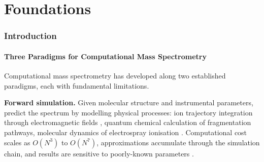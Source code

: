 \documentclass[11pt,twocolumn,a4paper]{article}
\theoremstyle{definition}
\theoremstyle{remark}
\begin{document}
\begin{abstract}
framework runs on a laptop integrated GPU (2--4 GB), with projected $5.7\times 10^9$ speedup over fingerprint comparison at PubChem scale ($N=10^8$). The central result: when observation is computation and the address is the trajectory, mass spectrometry becomes partition cell observation---not simulation, not database search, but physical measurement through GPU hardware oscillators.

\medskip
\noindent\textbf{Keywords:} observation-based computation, GPU fragment shaders, partition synthesis, Triple Equivalence, bounded phase space, ternary addressing, mass computing, compiled probe, physical observables, O(1) memory
\end{abstract}

\tableofcontents
\newpage


\part{Foundations}

\section{Introduction}
\label{sec:introduction}

\subsection{Three Paradigms for Computational Mass Spectrometry}

Computational mass spectrometry has developed along two established paradigms, each with fundamental limitations.

\textbf{Forward simulation.} Given molecular structure and instrumental parameters, predict the spectrum by modelling physical processes: ion trajectory integration through electromagnetic fields \citep{dahl2000simion}, quantum chemical calculation of fragmentation pathways, molecular dynamics of electrospray ionisation \citep{gross2017}. Computational cost scales as $O(N^3)$ to $O(N^7)$, approximations accumulate through the simulation chain, and results are sensitive to poorly-known parameters \citep{march2005}.
\end{document}

